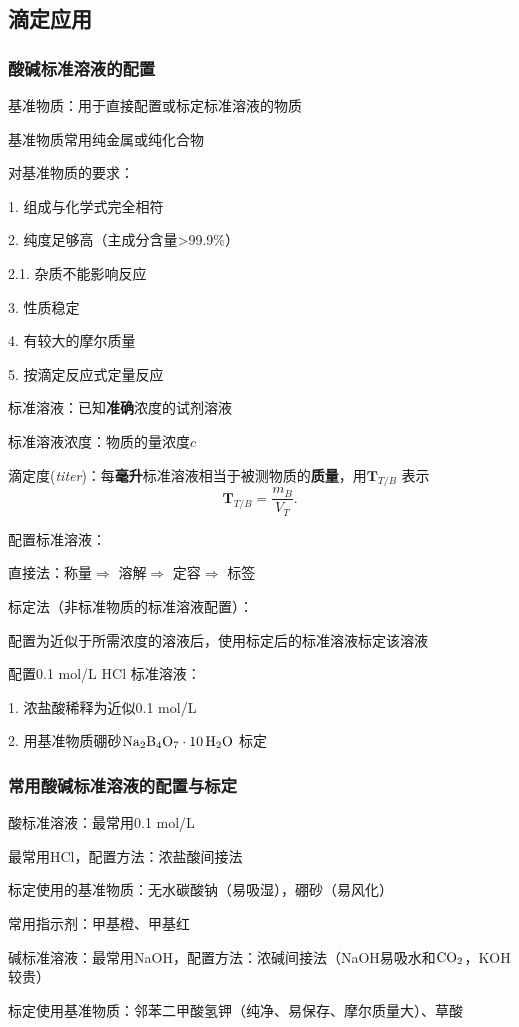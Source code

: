\subsection{滴定应用}%
\label{sub:滴定应用}
\subsubsection{酸碱标准溶液的配置}%
\label{subsub:酸碱标准溶液的配置}
\begin{defi}
    基准物质：用于直接配置或标定标准溶液的物质
\end{defi}
\begin{notation}
    基准物质常用纯金属或纯化合物
\end{notation}
对基准物质的要求：

1. 组成与化学式完全相符

2. 纯度足够高（主成分含量>99.9\%）

2.1. 杂质不能影响反应

3. 性质稳定

4. 有较大的摩尔质量

5. 按滴定反应式定量反应
\begin{defi}
    标准溶液：已知\textbf{准确}浓度的试剂溶液
\end{defi}
标准溶液浓度：物质的量浓度$c$
\begin{notation}
    滴定度(\textit{titer})：每\textbf{毫升}标准溶液相当于被测物质的\textbf{质量}，用$\bm{T}_{T / B}$ 表示
    \[
        \bm{T}_{T/B}=\frac{m_B}{V_T} 
    .\] 
\end{notation}
配置标准溶液：
\begin{notation}
    直接法：称量$\Rightarrow $ 溶解$\Rightarrow $ 定容$\Rightarrow $ 标签
\end{notation}
\begin{notation}
    标定法（非标准物质的标准溶液配置）：

    配置为近似于所需浓度的溶液后，使用标定后的标准溶液标定该溶液
\end{notation}
\begin{eg}
    配置0.1 mol/L HCl 标准溶液：

    1. 浓盐酸稀释为近似0.1 mol/L

2. 用基准物质硼砂$\ce{Na_2B_4O_7}\cdot \ce{10H_2O}$ 标定
\end{eg}
\subsubsection{常用酸碱标准溶液的配置与标定}%
\label{subsub:常用酸碱标准溶液的配置与标定}
\begin{notation}
    酸标准溶液：最常用0.1 mol/L

    最常用HCl，配置方法：浓盐酸间接法

    标定使用的基准物质：无水碳酸钠（易吸湿），硼砂（易风化）

    常用指示剂：甲基橙、甲基红
\end{notation}
\begin{notation}
    碱标准溶液：最常用NaOH，配置方法：浓碱间接法（NaOH易吸水和$\ce{CO_2}$，KOH较贵）

    标定使用基准物质：邻苯二甲酸氢钾（纯净、易保存、摩尔质量大）、草酸
\end{notation}
